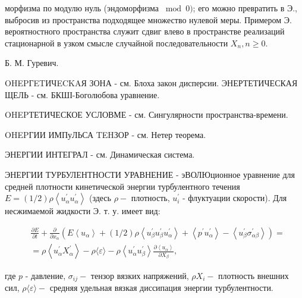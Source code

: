 \documentclass[10pt]{article}
\begin{document}
морфизма по модулю нуль (эндоморфизма $\bmod 0)$; его можно превратить в Э., выбросив из пространства подходящее множество нулевой меры. Примером Э. вероятностного пространства служит сдвиг влево в пространстве реализаций стационарной в узком смысле случайной последовательности $X_{n}, n \geqslant 0$.



Б. М. Гуревич.



OHEPГETИЧECKAЯ ЗОНА - см. Блоха закон дисперсии. ЭНЕРТЕТИЧЕСКАЯ ЩЕЛЬ - см. БКШІ-Боголюбова уравнение.



OHEPТЕТИЧЕСКОЕ УСЛОВМЕ - см. Сингулярности пространства-времени.



OHEPГИИ ИМПуЛЬСА TEHЗОР - см. Нетер теорема.



ЭНЕРГИИ ИНТЕГРАЛ - см. Динамическая система.



ЭНЕРГИИ ТУРБУЛЕНТНОСТИ УРАВНЕНИЕ - эВОЛЮционное уравнение для средней плотности кинетической энергии турбулентного течения $E=(1 / 2) \rho\left\langle u_{\alpha}^{\prime} u_{\alpha}^{\prime}\right\rangle$ (здесь $\rho-$ плотность, $u_{i}^{\prime}$ - флуктуации скорости). Для несжимаемой жидкости Э. т. у. имеет вид:



\[

\begin{aligned}

& \frac{\partial E}{\partial t}+\frac{\partial}{\partial x_{\alpha}}\left(E\left\langle u_{\alpha}\right\rangle+(1 / 2) \rho\left\langle u_{\beta}^{\prime} u_{\beta}^{\prime} u_{\alpha}^{\prime}\right\rangle+\left\langle p^{\prime} u_{\alpha}^{\prime}\right\rangle-\left\langle u_{\beta}^{\prime} \sigma_{\alpha \beta}^{\prime}\right\rangle\right)= \\

&=\rho\left\langle u_{\alpha}^{\prime} X_{\alpha}^{\prime}\right\rangle-\rho\langle\varepsilon\rangle-\rho\left\langle u_{\alpha}^{\prime} u_{\beta}^{\prime}\right\rangle \frac{\partial\left\langle u_{\alpha}\right\rangle}{\partial X_{\beta}},

\end{aligned}

\]



где $p$ - давление, $\sigma_{i j}-$ тензор вязких напряжений, $\rho X_{i}-$ плотность внешних сил, $\rho\langle\varepsilon\rangle-$ средняя удельная вязкая диссипация энергии турбулентности.
\end{document}
